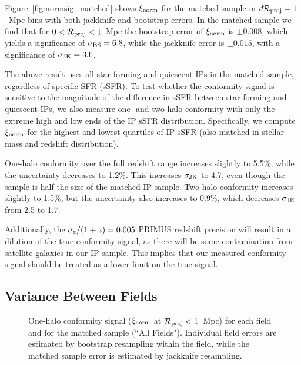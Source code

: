Figure~\ref{fig:normsig_matched} shows $\signorm$ for the matched sample in ${d\mathcal{R}_{\text{proj}}=1}$~Mpc bins with both jackknife and bootstrap errors.
In the matched sample we find that for ${0<\mathcal{R}_{\text{proj}}<1}$~Mpc the bootstrap error of $\signorm$ is ${\pm0.008}$, which yields a significance of $\sigmaBS=6.8$, while the jackknife error is ${\pm0.015}$, with a significance of $\sigmaJK=3.6$.
 
The above result uses all star-forming and quiescent IPs in the matched sample, regardless of specific SFR (sSFR).  
To test whether the conformity signal is sensitive to the magnitude of the difference in sSFR between star-forming and quiescent IPs, we also measure one- and two-halo conformity with only the extreme high and low ends of the IP sSFR distribution.  Specifically, we compute $\signorm$ for the highest and lowest quartiles of IP sSFR (also matched in stellar mass and redshift distribution).

One-halo conformity over the full redshift range increases slightly to 5.5\%, while the uncertainty decreases to 1.2\%.
This increases $\sigmaJK$ to 4.7, even though the sample is half the size of the matched IP sample.
Two-halo conformity increases slightly to 1.5\%, but the uncertainty also increases to 0.9\%, which decreases $\sigmaJK$ from 2.5 to 1.7.

Additionally, the ${\sigmaz/(1+z) = 0.005}$ PRIMUS redshift precision will result in a dilution of the 
true conformity signal, as there will be some contamination from satellite galaxies in our IP sample.
This implies that our measured conformity signal should be treated as a lower limit on the true signal.

\subsection{Variance Between Fields}\label{sec:cosmic_var}

\begin{figure}
  \epstrim{0.4in 0.7in 0.3in 0.3in}
  \caption{
One-halo conformity signal ($\signorm$ at $\mathcal{R}_{\text{proj}}<1$~Mpc) for each field and for the matched sample (``All Fields").
Individual field errors are estimated by bootstrap resampling within the field, while the matched sample error is estimated by jackknife resampling.
}
  \label{fig:normsig_fields_1halo}
\end{figure}

